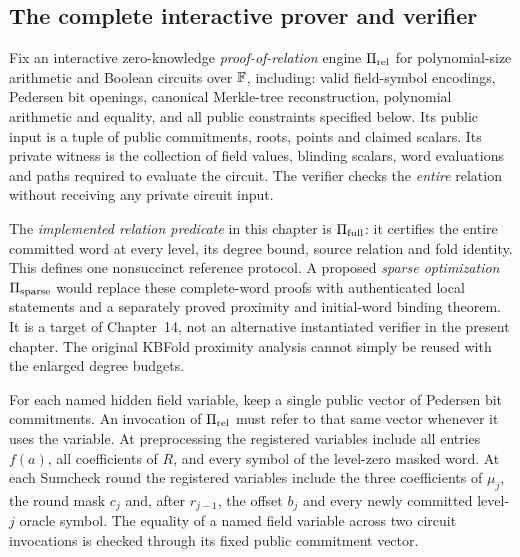 \subsection{The complete interactive prover and verifier}\label{sec:full:protocol}

\begin{definition}\label{def:full:proof-engine}
Fix an interactive zero-knowledge \emph{proof-of-relation}
engine $\Pi_{\rm rel}$ for polynomial-size arithmetic and
Boolean circuits over $\mathbb{F}$, including:
valid field-symbol encodings, Pedersen bit openings,
canonical Merkle-tree reconstruction, polynomial
arithmetic and equality, and all public constraints
specified below.
Its public input is a tuple of public commitments,
roots, points and claimed scalars. Its private
witness is the collection of field values,
blinding scalars, word evaluations and paths
required to evaluate the circuit.
The verifier checks the \emph{entire} relation
without receiving any private circuit input.

The \emph{implemented relation predicate}
in this chapter is $\Pi_{\rm full}$:
it certifies the entire committed
word at every level, its degree
bound, source relation and fold
identity. This defines one
nonsuccinct reference protocol.
A proposed \emph{sparse optimization}
$\Pi_{\rm sparse}$ would replace
these complete-word proofs with
authenticated local statements
and a separately proved proximity
and initial-word binding theorem.
It is a target of Chapter~14,
not an alternative instantiated
verifier in the present chapter.
The original KBFold proximity
analysis cannot simply be reused
with the enlarged degree budgets.
\end{definition}

\begin{definition}\label{def:full:registry}
For each named hidden field variable, keep
a single public vector of Pedersen bit
commitments. An invocation of
$\Pi_{\rm rel}$ must refer to that same
vector whenever it uses the variable.
At preprocessing the registered variables
include all entries $f(a)$, all
coefficients of $R$, and every
symbol of the level-zero masked word.
At each Sumcheck round the registered
variables include the three coefficients
of $\mu_j$, the round mask $c_j$
and, after $r_{j-1}$, the offset $b_j$
and every newly committed level-$j$
oracle symbol.
The equality of a named field variable
across two circuit invocations is checked
through its fixed public commitment vector.
\end{definition}

